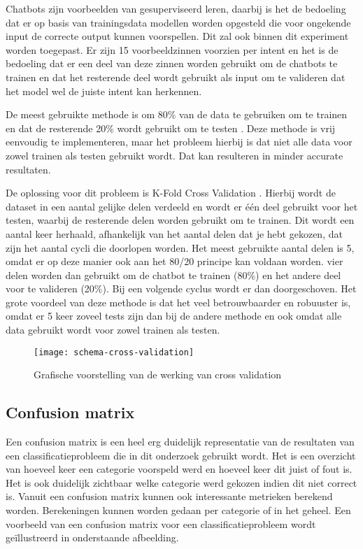 Chatbots zijn voorbeelden van gesuperviseerd leren, daarbij is het de bedoeling dat er op basis van trainingsdata modellen worden opgesteld die voor ongekende input de correcte output kunnen voorspellen. Dit zal ook binnen dit experiment worden toegepast. Er zijn 15 voorbeeldzinnen voorzien per intent en het is de bedoeling dat er een deel van deze zinnen worden gebruikt om de chatbots te trainen en dat het resterende deel wordt gebruikt als input om te valideren dat het model wel de juiste intent kan herkennen.

De meest gebruikte methode is om 80\% van de data te gebruiken om te trainen en dat de resterende 20\% wordt gebruikt om te testen \autocite{Desmarais2018}. Deze methode is vrij eenvoudig te implementeren, maar het probleem hierbij is dat niet alle data voor zowel trainen als testen gebruikt wordt. Dat kan resulteren in minder accurate resultaten.

De oplossing voor dit probleem is K-Fold Cross Validation \autocite{Desmarais2018}. Hierbij wordt de dataset in een aantal gelijke delen verdeeld en wordt er één deel gebruikt voor het testen, waarbij de resterende delen worden gebruikt om te trainen. Dit wordt een aantal keer herhaald, afhankelijk van het aantal delen dat je hebt gekozen, dat zijn het aantal cycli die doorlopen worden. Het meest gebruikte aantal delen is 5, omdat er op deze manier ook aan het 80/20 principe kan voldaan worden. vier delen worden dan gebruikt om de chatbot te trainen (80\%) en het andere deel voor te valideren (20\%). Bij een volgende cyclus wordt er dan doorgeschoven. Het grote voordeel van deze methode is dat het veel betrouwbaarder en robuuster is, omdat er 5 keer zoveel tests zijn dan bij de andere methode en ook omdat alle data gebruikt wordt voor zowel trainen als testen.

\begin{figure}[H]
    \label{fig:cross-validation-schema}
    \centering
    \texttt{[image: schema-cross-validation]}
    \caption{Grafische voorstelling van de werking van cross validation}
\end{figure}

\subsection{Confusion matrix}
\label{subsec:validatie-confusion-matrix}

Een confusion matrix is een heel erg duidelijk representatie van de resultaten van een classificatieprobleem die in dit onderzoek gebruikt wordt. Het is een overzicht van hoeveel keer een categorie voorspeld werd en hoeveel keer dit juist of fout is. Het is ook duidelijk zichtbaar welke categorie werd gekozen indien dit niet correct is. Vanuit een confusion matrix kunnen ook interessante metrieken berekend worden. Berekeningen kunnen worden gedaan per categorie of in het geheel. Een voorbeeld van een confusion matrix voor een classificatieprobleem wordt geïllustreerd in onderstaande afbeelding.


